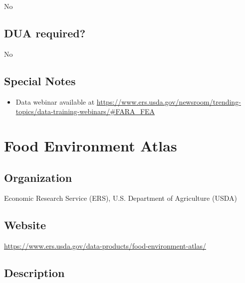 \documentclass[
]{book}
\providecommand{\tightlist}{%
  \setlength{\itemsep}{0pt}\setlength{\parskip}{0pt}}
\begin{document}
No

\hypertarget{dua-required-25}{%
\section{DUA required?}\label{dua-required-25}}

No

\hypertarget{special-notes-25}{%
\section{Special Notes}\label{special-notes-25}}

\begin{itemize}
\tightlist
\item
  Data webinar available at \url{https://www.ers.usda.gov/newsroom/trending-topics/data-training-webinars/\#FARA_FEA}
\end{itemize}

\mainmatter

\hypertarget{food-environment-atlas}{%
\chapter{Food Environment Atlas}\label{food-environment-atlas}}

\hypertarget{organization-26}{%
\section{Organization}\label{organization-26}}

Economic Research Service (ERS), U.S. Department of Agriculture (USDA)

\hypertarget{website-26}{%
\section{Website}\label{website-26}}

\url{https://www.ers.usda.gov/data-products/food-environment-atlas/}

\hypertarget{description-26}{%
\section{Description}\label{description-26}}
\end{document}
